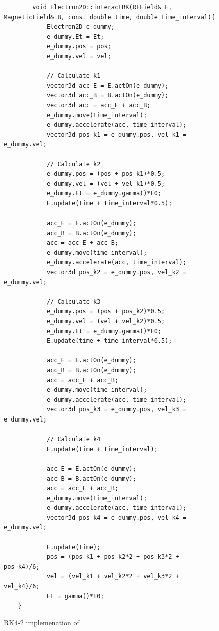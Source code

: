 \documentclass{book}
\begin{document}
\begin{figure}[H]
    \centering
    \captionsetup{justification=centering}
    \begin{verbatim}
        void Electron2D::interactRK(RFField& E, MagneticField& B, const double time, double time_interval){
            Electron2D e_dummy;
            e_dummy.Et = Et;
            e_dummy.pos = pos;
            e_dummy.vel = vel;
    
            // Calculate k1
            vector3d acc_E = E.actOn(e_dummy);
            vector3d acc_B = B.actOn(e_dummy);
            vector3d acc = acc_E + acc_B;
            e_dummy.move(time_interval);
            e_dummy.accelerate(acc, time_interval);
            vector3d pos_k1 = e_dummy.pos, vel_k1 = e_dummy.vel;
    
            // Calculate k2
            e_dummy.pos = (pos + pos_k1)*0.5;
            e_dummy.vel = (vel + vel_k1)*0.5;
            e_dummy.Et = e_dummy.gamma()*E0;
            E.update(time + time_interval*0.5);
    
            acc_E = E.actOn(e_dummy);
            acc_B = B.actOn(e_dummy);
            acc = acc_E + acc_B;
            e_dummy.move(time_interval);
            e_dummy.accelerate(acc, time_interval);
            vector3d pos_k2 = e_dummy.pos, vel_k2 = e_dummy.vel;
    
            // Calculate k3
            e_dummy.pos = (pos + pos_k2)*0.5;
            e_dummy.vel = (vel + vel_k2)*0.5;
            e_dummy.Et = e_dummy.gamma()*E0;
            E.update(time + time_interval*0.5);

            acc_E = E.actOn(e_dummy);
            acc_B = B.actOn(e_dummy);
            acc = acc_E + acc_B;
            e_dummy.move(time_interval);
            e_dummy.accelerate(acc, time_interval);
            vector3d pos_k3 = e_dummy.pos, vel_k3 = e_dummy.vel;
    
            // Calculate k4
            E.update(time + time_interval);

            acc_E = E.actOn(e_dummy);
            acc_B = B.actOn(e_dummy);
            acc = acc_E + acc_B;
            e_dummy.move(time_interval);
            e_dummy.accelerate(acc, time_interval);
            vector3d pos_k4 = e_dummy.pos, vel_k4 = e_dummy.vel;
    
            E.update(time);
            pos = (pos_k1 + pos_k2*2 + pos_k3*2 + pos_k4)/6;
            vel = (vel_k1 + vel_k2*2 + vel_k3*2 + vel_k4)/6;
            Et = gamma()*E0;
    }
    \end{verbatim}
\caption{RK4-2 implemenation of \eEM}
\label{fig:rk2_EM}
\end{figure}
\end{document}
